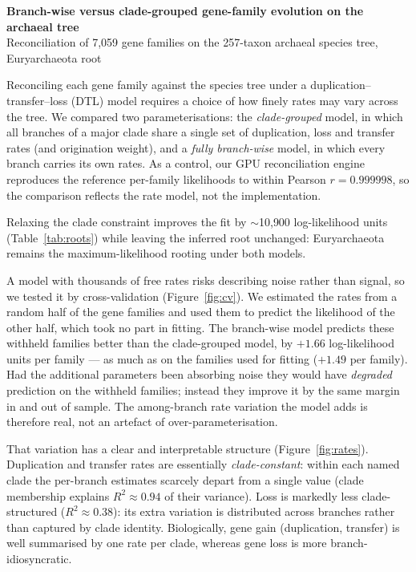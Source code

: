 \documentclass[11pt]{article}
\begin{document}
\begin{center}
{\large\bfseries Branch-wise versus clade-grouped gene-family evolution on the archaeal tree}\\[2pt]
{\small Reconciliation of 7{,}059 gene families on the 257-taxon archaeal species tree, Euryarchaeota root}
\end{center}

\noindent
Reconciling each gene family against the species tree under a duplication--transfer--loss
(DTL) model requires a choice of how finely rates may vary across the tree. We compared two
parameterisations: the \emph{clade-grouped} model, in which all branches of a major clade
share a single set of duplication, loss and transfer rates (and origination weight), and a
\emph{fully branch-wise} model, in which every branch carries its own rates. As a control,
our GPU reconciliation engine reproduces the reference per-family likelihoods to within
Pearson $r=0.999998$, so the comparison reflects the rate model, not the implementation.

Relaxing the clade constraint improves the fit by $\sim$10{,}900 log-likelihood units
(Table~\ref{tab:roots}) while leaving the inferred root unchanged: Euryarchaeota remains the
maximum-likelihood rooting under both models.

A model with thousands of free rates risks describing noise rather than signal, so we tested
it by cross-validation (Figure~\ref{fig:cv}). We estimated the rates from a random half of the
gene families and used them to predict the likelihood of the other half, which took no part in
fitting. The branch-wise model predicts these withheld families better than the clade-grouped
model, by $+1.66$ log-likelihood units per family --- as much as on the families used for
fitting ($+1.49$ per family). Had the additional parameters been absorbing noise they would
have \emph{degraded} prediction on the withheld families; instead they improve it by the same
margin in and out of sample. The among-branch rate variation the model adds is therefore real,
not an artefact of over-parameterisation.

That variation has a clear and interpretable structure (Figure~\ref{fig:rates}). Duplication
and transfer rates are essentially \emph{clade-constant}: within each named clade the
per-branch estimates scarcely depart from a single value (clade membership explains
$R^2\!\approx\!0.94$ of their variance). Loss is markedly less clade-structured
($R^2\!\approx\!0.38$): its extra variation is distributed across branches rather than captured
by clade identity. Biologically, gene gain (duplication, transfer) is well summarised by one
rate per clade, whereas gene loss is more branch-idiosyncratic.
\end{document}
